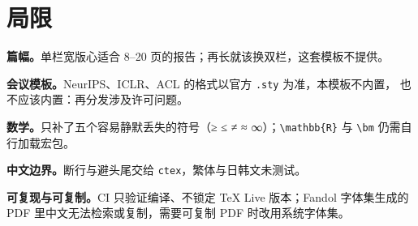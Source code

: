\section{局限}
\label{sec:limit}

\textbf{篇幅。}单栏宽版心适合 8--20 页的报告；再长就该换双栏，这套模板不提供。

\textbf{会议模板。}NeurIPS、ICLR、ACL 的格式以官方 \texttt{.sty} 为准，本模板不内置，
也不应该内置：再分发涉及许可问题。

\textbf{数学。}只补了五个容易静默丢失的符号（≥ ≤ ≠ ≈ ∞）；\verb|\mathbb{R}| 与
\verb|\bm| 仍需自行加载宏包。

\textbf{中文边界。}断行与避头尾交给 \texttt{ctex}，繁体与日韩文未测试。

\textbf{可复现与可复制。}CI 只验证编译、不锁定 TeX Live 版本；Fandol 字体集生成的
PDF 里中文无法检索或复制，需要可复制 PDF 时改用系统字体集。
